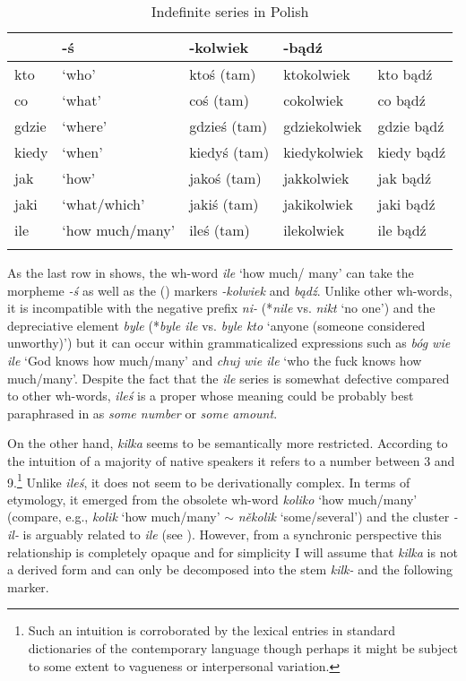 \documentclass[output=paper, newtxmath, colorlinks, citecolor=brown]{langsci/langscibook}
\begin{document}
	\begin{table}[h]
		\centering
		\caption{Indefinite series in Polish}
		\label{table:indefinite-series-in-polish}
		\begin{tabularx}{\textwidth}{llXXX}
			\lsptoprule
			\multicolumn{2}{l}{wh-word} & -ś     & -kolwiek     & -bądź      \\ \midrule
			kto     & `who'   & ktoś (tam)   & ktokolwiek   & kto bądź   \\
			co      & `what'   & coś (tam)   & cokolwiek    & co bądź    \\
			gdzie   & `where'  & gdzieś (tam) & gdziekolwiek & gdzie bądź \\
			kiedy   & `when'   & kiedyś (tam) & kiedykolwiek & kiedy bądź \\
			jak     & `how'    & jakoś (tam) & jakkolwiek   & jak bądź   \\
			jaki    & `what/which'   & jakiś (tam) & jakikolwiek  & jaki bądź  \\
			ile     & `how much/many'  & ileś (tam)  & ilekolwiek   & ile bądź   \\ \lspbottomrule
		\end{tabularx}
	\end{table}

	As the last row in  shows, the  wh-word \textit{ile} `how much/ many' can take the  morpheme \textit{-ś} as well as the  () markers \textit{-kolwiek} and \textit{bądź}. Unlike other wh-words, it is incompatible with the negative prefix \textit{ni-} (*\textit{nile} vs. \textit{nikt} `no one') and the depreciative  element \textit{byle} (*\textit{byle ile} vs. \textit{byle kto} `anyone (someone considered unworthy)') but it can occur within grammaticalized expressions such as \textit{bóg wie ile} `God knows how much/many' and \textit{chuj wie ile} `who the fuck knows how much/many'. Despite the fact that the \textit{ile} series is somewhat defective compared to other wh-words, \textit{ileś} is a proper  whose meaning could be probably best paraphrased in  as \textit{some number} or \textit{some amount}.

	On the other hand, \textit{kilka} seems to be semantically more restricted. According to the intuition of a majority of  native speakers it refers to a number between 3 and 9.\footnote{Such an intuition is corroborated by the lexical entries in standard dictionaries of the contemporary  language though perhaps it might be subject to some extent to vagueness or interpersonal variation.} Unlike \textit{ileś}, it does not seem to be derivationally complex. In terms of etymology, it emerged from the obsolete wh-word \textit{koliko} `how much/many' (compare, e.g.,  \textit{kolik} `how much/many' $\sim$ \textit{několik} `some/several') and the cluster \textit{-il-} is arguably related to \textit{ile} (see \citealt{bankowski2000etymologiczny}). However, from a synchronic perspective this relationship is completely opaque and for simplicity I will assume that \textit{kilka} is not a derived form and can only be decomposed into the stem \textit{kilk-} and the following  marker.
\end{document}
